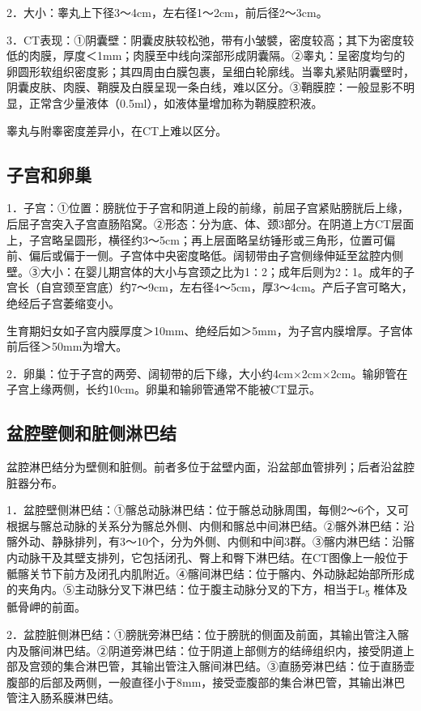 2．大小：睾丸上下径3～4cm，左右径1～2cm，前后径2～3cm。

3．CT表现：①阴囊壁：阴囊皮肤较松弛，带有小皱襞，密度较高；其下为密度较低的肉膜，厚度＜1mm；肉膜至中线向深部形成阴囊隔。②睾丸：呈密度均匀的卵圆形软组织密度影；其四周由白膜包裹，呈细白轮廓线。当睾丸紧贴阴囊壁时，阴囊皮肤、肉膜、鞘膜及白膜呈现一条白线，难以区分。③鞘膜腔：一般显影不明显，正常含少量液体（0.5ml），如液体量增加称为鞘膜腔积液。

睾丸与附睾密度差异小，在CT上难以区分。

\subsection{子宫和卵巢}

1．子宫：①位置：膀胱位于子宫和阴道上段的前缘，前屈子宫紧贴膀胱后上缘，后屈子宫突入子宫直肠陷窝。②形态：分为底、体、颈3部分。在阴道上方CT层面上，子宫略呈圆形，横径约3～5cm；再上层面略呈纺锤形或三角形，位置可偏前、偏后或偏于一侧。子宫体中央密度略低。阔韧带由子宫侧缘伸延至盆腔内侧壁。③大小：在婴儿期宫体的大小与宫颈之比为1∶2；成年后则为2∶1。成年的子宫长（自宫颈至宫底）约7～9cm，左右径4～5cm，厚3～4cm。产后子宫可略大，绝经后子宫萎缩变小。

生育期妇女如子宫内膜厚度＞10mm、绝经后如＞5mm，为子宫内膜增厚。子宫体前后径＞50mm为增大。

2．卵巢：位于子宫的两旁、阔韧带的后下缘，大小约4cm×2cm×2cm。输卵管在子宫上缘两侧，长约10cm。卵巢和输卵管通常不能被CT显示。

\subsection{盆腔壁侧和脏侧淋巴结}

盆腔淋巴结分为壁侧和脏侧。前者多位于盆壁内面，沿盆部血管排列；后者沿盆腔脏器分布。

1．盆腔壁侧淋巴结：①髂总动脉淋巴结：位于髂总动脉周围，每侧2～6个，又可根据与髂总动脉的关系分为髂总外侧、内侧和髂总中间淋巴结。②髂外淋巴结：沿髂外动、静脉排列，有3～10个，分为外侧、内侧和中间3群。③髂内淋巴结：沿髂内动脉干及其壁支排列，它包括闭孔、臀上和臀下淋巴结。在CT图像上一般位于骶髂关节下前方及闭孔内肌附近。④髂间淋巴结：位于髂内、外动脉起始部所形成的夹角内。⑤主动脉分叉下淋巴结：位于腹主动脉分叉的下方，相当于L\textsubscript{5}
椎体及骶骨岬的前面。

2．盆腔脏侧淋巴结：①膀胱旁淋巴结：位于膀胱的侧面及前面，其输出管注入髂内及髂间淋巴结。②阴道旁淋巴结：位于阴道上部侧方的结缔组织内，接受阴道上部及宫颈的集合淋巴管，其输出管注入髂间淋巴结。③直肠旁淋巴结：位于直肠壶腹部的后部及两侧，一般直径小于8mm，接受壶腹部的集合淋巴管，其输出淋巴管注入肠系膜淋巴结。

